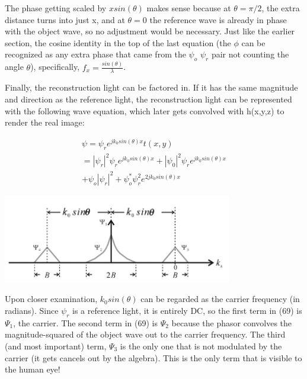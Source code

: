 \documentclass[12pt]{article}
\begin{document}
The phase getting scaled by \(xsin(\theta)\) makes sense because at \(\theta = \pi/2\), the extra distance turns into just x, and at \(\theta = 0\)
the reference wave is already in phase with the object wave, so no adjustment would be necessary. Just like the earlier section, the cosine identity in the top of the last equation (the \(\phi\) can be recognized as any extra phase that came from the \(\psi_{o}\) \(\psi_{r}\) pair not counting the angle \(\theta\)), specifically, \(f_{x} = \frac{sin(\theta)}{\lambda}\).

Finally, the reconstruction light can be factored in. If it has the same magnitude and direction as the reference light, the reconstruction light can be represented with the following wave equation, which later gets convolved with h(x,y,z) to render the real image:

\begin{equation}
	\begin{multlined}
	\psi = \psi_{r}e^{jk_{0}sin(\theta)x}t(x,y)
	\\=|\psi_{r}|^2\psi_{r}e^{jk_{0}sin(\theta)x} + |\psi_{0}|^2\psi_{r}e^{jk_{0}sin(\theta)x}
	\\+ \psi_{o}|\psi_{r}|^2 + \psi_{o}^*\psi_{r}^2e^{2jk_{0}sin(\theta)x}
	\end{multlined}
\end{equation}

\begin{center}
\includegraphics[width=100mm]{tupac14.png}
\end{center}

Upon closer examination, \(k_{0}sin(\theta)\) can be regarded as the carrier frequency (in radians). Since \(\psi_{r}\) is a reference light, it is entirely DC, so the first term in (69) is \(\Psi_{1}\), the carrier.
The second term in (69) is \(\Psi_{2}\) because the phasor convolves the magnitude-squared of the object wave out to the carrier frequency.
The third (and most important) term, \(\Psi_{3}\) is the only one that is not modulated by the carrier (it gets cancels out by the algebra).
This is the only term that is visible to the human eye!
\end{document}
